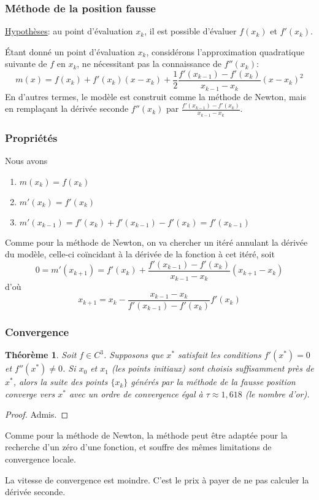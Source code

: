 \documentclass[t,usepdftitle=false]{beamer}
\newtheorem{thm}{Théorème}
\begin{document}
\begin{frame}
\frametitle{Méthode de la position fausse}

\underline{Hypothèses}: au point d'évaluation $x_k$, il est possible d'évaluer
$f(x_k)$ et $f'(x_k)$.

Étant donné un point d'évaluation $x_k$, considérons l'approximation quadratique suivante de $f$ en $x_k$, ne nécessitant pas la connaissance de $f''(x_k)$:
$$
m(x) = f(x_k) + f'(x_k)(x-x_k) + \frac{1}{2}\frac{f'(x_{k-1}) - f'(x_k)}{x_{k-1}-x_k}(x-x_k)^2
$$
En d'autres termes, le modèle est construit comme la méthode de Newton, mais en remplaçant la dérivée seconde $f''(x_k)$ par $\frac{f'(x_{k-1}) - f'(x_k)}{x_{k-1}-x_k}$.

\end{frame}

\begin{frame}
\frametitle{Propriétés}

Nous avons
\begin{enumerate}
	\item 
	$m(x_k) = f(x_k)$
	\item
	$m'(x_k) = f'(x_k)$
	\item
	$m'(x_{k-1}) = f'(x_k)+f'(x_{k-1})-f'(x_k) = f'(x_{k-1})$
\end{enumerate}

\mbox{}

Comme pour la méthode de Newton, on va chercher un itéré annulant la dérivée du modèle, celle-ci coïncidant à la dérivée de la fonction à cet itéré, soit
$$
0 = m'(x_{k+1}) = f'(x_k) + \frac{f'(x_{k-1}) - f'(x_k)}{x_{k-1}-x_k}(x_{k+1}-x_k)
$$
d'où
$$
x_{k+1} = x_k - \frac{x_{k-1}-x_k}{f'(x_{k-1}) - f'(x_k)}f'(x_k)
$$

\end{frame}

\begin{frame}
\frametitle{Convergence}

\begin{thm}
Soit $f \in C^3$.
Supposons que $x^*$ satisfait les conditions $f'(x^*) = 0$ et $f''(x^*) \ne 0$.
Si $x_0$ et $x_1$ (les points initiaux) sont choisis suffisamment près de $x^*$,
alors la suite des points $\lbrace x_k \rbrace$ générés par la méthode de la fausse position
converge vers $x^*$ avec un ordre de convergence égal à $\tau \approx 1,618$ (le nombre d'or).
\end{thm}

\begin{proof}
Admis.
\end{proof}

Comme pour la méthode de Newton, la méthode peut être adaptée pour la recherche d'un zéro d'une fonction, et souffre des mêmes limitations de convergence locale.

\mbox{}

La vitesse de convergence est moindre. C'est le prix à payer de ne pas calculer la dérivée seconde.

\end{frame}
\end{document}
